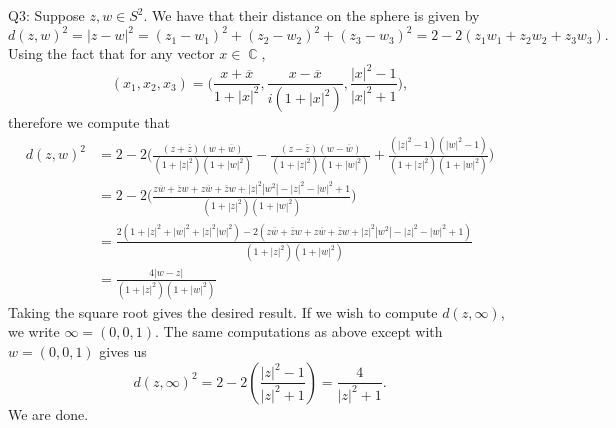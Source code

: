 \documentclass[letterpaper]{article}
\DeclareMathOperator{\C}{\mathbb{C}}
\newcommand{\ol}{\overline}
\begin{document}
 \noindent Q3:
Suppose $z,w\in S^2$. We have that their distance on the sphere is given by $$d(z,w)^2 = |z-w|^2 = (z_1-w_1)^2 + (z_2-w_2)^2 + (z_3-w_3)^2 = 2- 2(z_1w_1 +z_2w_2+ z_3w_3).$$
Using the fact that for any vector $x\in \C$, $$(x_1,x_2,x_3) = \Big(\frac{x+\ol{x}}{1+|x|^2},\frac{x-\ol{x}}{i(1+|x|^2)}, \frac{|x|^2-1}{|x|^2+1} \Big),$$ 
therefore we compute that 
\begin{align*}
    d(z,w)^2 & = 2 - 2\Big(\frac{(z+\ol{z})(w+\ol{w})}{(1+|z|^2)(1+|w|^2)} - \frac{(z-\ol{z})(w-\ol{w})}{(1+|z|^2)(1+|w|^2)}+ \frac{(|z|^2-1)(|w|^2-1)}{(1+|z|^2)(1+|w|^2)} \Big)
    \\ & = 2 - 2\Big( \frac{z\ol{w} +\ol{z}w + z\ol{w} + \ol{z}w + |z|^2|w^2|-|z|^2-|w|^2 +1}{(1+|z|^2)(1+|w|^2)} \Big)
    \\ & = \frac{2(1+|z|^2+|w|^2 +|z|^2|w|^2) - 2(z\ol{w} +\ol{z}w + z\ol{w} + \ol{z}w + |z|^2|w^2|-|z|^2-|w|^2 +1)}{(1+|z|^2)(1+|w|^2)}
    \\ & = \frac{4|w-z|}{(1+|z|^2)(1+|w|^2)}
\end{align*} Taking the square root gives the desired result. 
If we wish to compute $d(z,\infty)$, we write $\infty = (0,0,1)$. The same computations as above except with $w=(0,0,1)$ gives us $$d(z,\infty)^2 = 2 - 2(\frac{|z|^2-1}{|z|^2+1}) = \frac{4}{|z|^2+1}.$$
We are done. 
\end{document}
